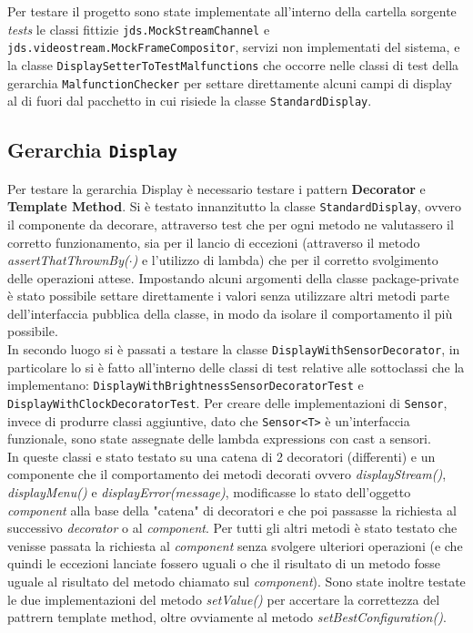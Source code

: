\documentclass[a4paper,11pt]{article}
\begin{document}
	Per testare il progetto sono state implementate all'interno della cartella sorgente \textit{tests} le classi fittizie \texttt{jds.MockStreamChannel} e \texttt{jds.videostream.MockFrameCompositor}, servizi non implementati del sistema, e la classe \texttt{DisplaySetterToTestMalfunctions} che occorre nelle classi di test della gerarchia \texttt{MalfunctionChecker} per settare direttamente alcuni campi di display al di fuori dal pacchetto in cui risiede la classe \texttt{StandardDisplay}.
	
	\subsection{Gerarchia \texttt{Display}}
	Per testare la gerarchia Display è necessario testare i pattern \textbf{Decorator} e \textbf{Template Method}.
	Si è testato innanzitutto la classe \texttt{StandardDisplay}, ovvero il componente da decorare, attraverso test che per ogni metodo ne valutassero il corretto funzionamento, sia per il lancio di eccezioni (attraverso il metodo \textit{assertThatThrownBy($\cdot$)} e l'utilizzo di lambda) che per il corretto svolgimento delle operazioni attese. Impostando alcuni argomenti della classe package-private è stato possibile settare direttamente i valori senza utilizzare altri metodi parte dell'interfaccia pubblica della classe, in modo da isolare il comportamento il più possibile.\\
	In secondo luogo si è passati a testare la classe \texttt{DisplayWithSensorDecorator}, in particolare lo si è fatto all'interno delle classi di test relative alle sottoclassi che la implementano: \texttt{DisplayWithBrightnessSensorDecoratorTest} e \texttt{DisplayWithClockDecoratorTest}.
	Per creare delle implementazioni di \texttt{Sensor}, invece di produrre classi aggiuntive, dato che \texttt{Sensor<T>} è un'interfaccia funzionale, sono state assegnate delle lambda expressions con cast a sensori.\\
	In queste classi e stato testato su una catena di 2 decoratori (differenti) e un componente che il comportamento dei metodi decorati ovvero \textit{displayStream()}, \textit{displayMenu()} e \textit{displayError(message)}, modificasse lo stato dell'oggetto \textit{component} alla base della "catena" di decoratori e che poi passasse la richiesta al successivo \textit{decorator} o al \textit{component}. Per tutti gli altri metodi è stato testato che venisse passata la richiesta al \textit{component} senza svolgere ulteriori operazioni (e che quindi le eccezioni lanciate fossero uguali o che il risultato di un metodo fosse uguale al risultato del metodo chiamato sul \textit{component}).
	Sono state inoltre testate le due implementazioni del metodo \textit{setValue()} per accertare la correttezza del pattrern template method, oltre ovviamente al metodo \textit{setBestConfiguration()}.
	
\end{document}
